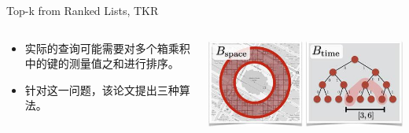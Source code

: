 \documentclass[10pt,aspectratio=169]{beamer}
\begin{document}
\begin{frame}{Top-k from Ranked Lists, TKR}
    \begin{columns}

        \begin{column}{.6\textwidth}
            \begin{itemize}[<+->]
                \item 实际的查询可能需要对多个箱乘积中的键的测量值之和进行排序。
                \item 针对这一问题，该论文提出三种算法。
            \end{itemize}
        \end{column}
        \begin{column}{.4\textwidth}
            \includegraphics[width=\textwidth]{pic/query.jpg}
        \end{column}
    \end{columns}
\end{frame}
\end{document}

